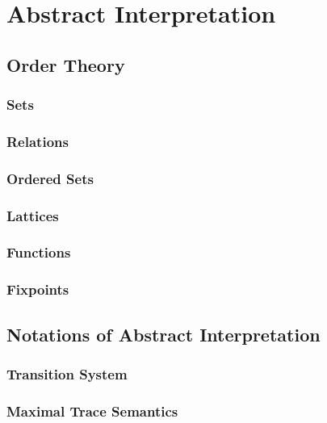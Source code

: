 
\chapter{Abstract Interpretation}

\section{Order Theory}

\subsection{Sets}

\subsection{Relations}

\subsection{Ordered Sets}

\subsection{Lattices}

\subsection{Functions}

\subsection{Fixpoints}

\section{Notations of Abstract Interpretation}

\subsection{Transition System}

\subsection{Maximal Trace Semantics}

